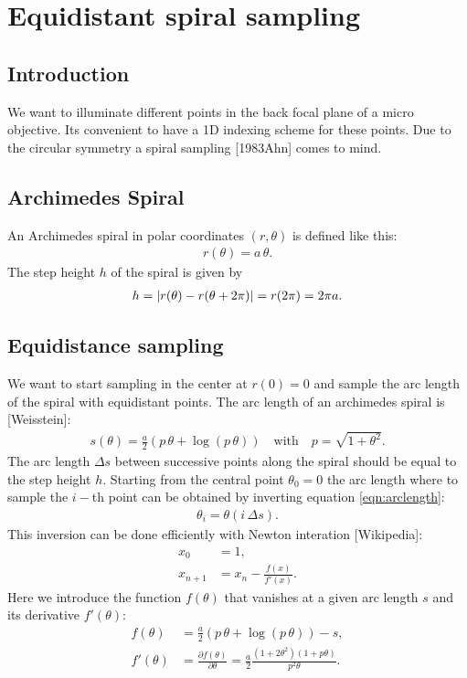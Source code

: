 \renewcommand{\(}{\left(}
\renewcommand{\)}{\right)}
\chapter{Equidistant spiral sampling}
\section{Introduction}
We want to illuminate different points in the back focal plane of a
micro objective. Its convenient to have a 1D indexing scheme for these
points. Due to the circular symmetry a spiral sampling [1983Ahn] comes
to mind. 

\section{Archimedes Spiral}
An Archimedes spiral in polar coordinates $(r,\theta)$ is defined like
this:
\begin{align} \label{eqn:def}
  r(\theta)=a\,\theta.
\end{align}
The step height $h$ of the spiral is given by
\begin{align}
  h=\mathopen| r(\theta)-r(\theta+2\pi) \mathclose|=r(2\pi)=2\pi a.
\end{align}
\section{Equidistance sampling}
We want to start sampling in the center at $r(0)=0$ and sample the arc
length of the spiral with equidistant points. The arc length of an
archimedes spiral is [Weisstein]:
\begin{align} \label{eqn:arclength}
  s(\theta)=\frac{a}{2}\(p\,\theta + \log(p\,\theta)\)\quad\textrm{with}\quad
  p=\sqrt{1+\theta^2}.
\end{align}
The arc length $\Delta s$ between successive points along the spiral
should be equal to the step height $h$. Starting from the central
point $\theta_0=0$ the arc length where to sample the $i-$th point can
be obtained by inverting equation \eqref{eqn:arclength}:
\begin{align}
  \theta_i=\theta(i\,\Delta s).
\end{align}
This inversion can be done efficiently with Newton interation
[Wikipedia]:
\begin{align}
  x_0&=1,\\
  x_{n+1}&=x_n-\frac{f(x)}{f'(x)}.
\end{align}
Here we introduce the function $f(\theta)$ that vanishes at a given arc
length $s$ and its derivative $f'(\theta)$:
\begin{align}
  \label{eqn:f}
  f(\theta)&=\frac{a}{2}\(p\,\theta+\log(p\,\theta)\)-s,\\
  f'(\theta)&=\frac{\partial f(\theta)}{\partial \theta}=
  \frac{a}{2}\frac{(1+2\theta^2)(1+p\theta)}{p^2 \theta}.
\end{align}
